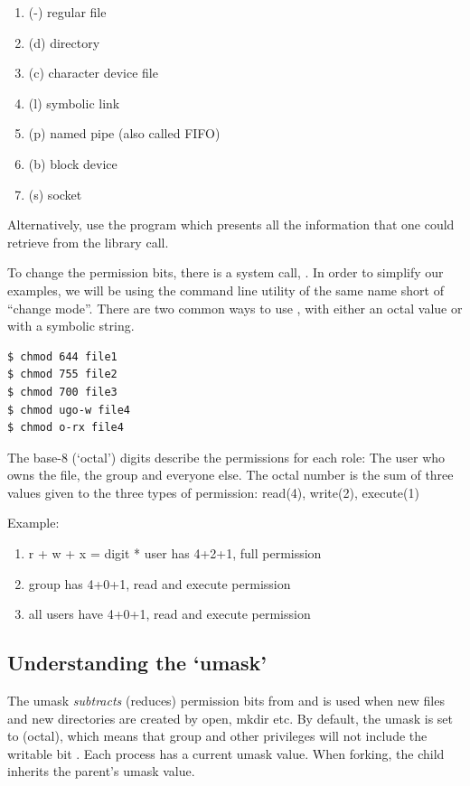 \begin{enumerate}
    \item (-) regular file
    \item (d) directory
    \item (c) character device file
    \item (l) symbolic link
    \item (p) named pipe (also called FIFO)
    \item (b) block device
    \item (s) socket
\end{enumerate}

Alternatively, use the program  which presents all the information that one could retrieve from the  library call.

To change the permission bits, there is a system call, .
In order to simplify our examples, we will be using the command line utility of the same name  short of ``change mode''.
There are two common ways to use , with either an octal value or with a symbolic string.

\begin{lstlisting}[language=bash]
$ chmod 644 file1
$ chmod 755 file2
$ chmod 700 file3
$ chmod ugo-w file4
$ chmod o-rx file4
\end{lstlisting}

The base-8 (`octal') digits describe the permissions for each role: The user who owns the file, the group and everyone else.
The octal number is the sum of three values given to the three types of permission: read(4), write(2), execute(1)

Example: 

\begin{enumerate}
\item r + w + x = digit * user has 4+2+1, full permission
\item group has 4+0+1, read and execute permission
\item all users have 4+0+1, read and execute permission
\end{enumerate}

\subsection{Understanding the `umask'}

The umask \emph{subtracts} (reduces) permission bits from  and is used when new files and new directories are created by open, mkdir etc.
By default, the umask is set to  (octal), which means that group and other privileges will not include the writable bit .
Each process has a current umask value.
When forking, the child inherits the parent's umask value.

